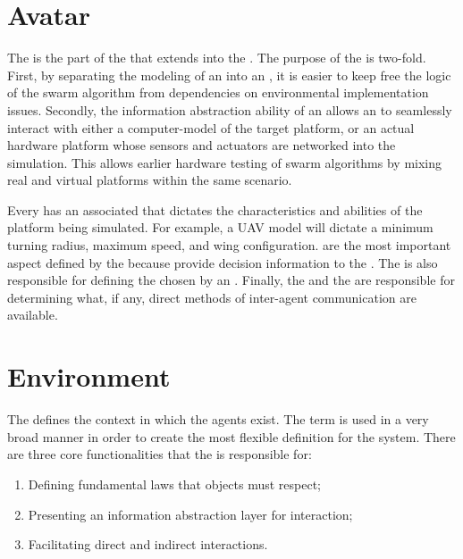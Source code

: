 \clearpage

\section{Avatar}
The  is the part of the  that extends into the . The purpose of the  is two-fold. First, by separating the modeling of an  into an , it is easier to keep free the logic of the swarm algorithm from dependencies on environmental implementation issues. Secondly, the information abstraction ability of an  allows an  to seamlessly interact with either a computer-model of the target platform, or an actual hardware platform whose sensors and actuators are networked into the simulation. This allows earlier hardware testing of swarm algorithms by mixing real and virtual platforms within the same scenario.

Every  has an associated  that dictates the characteristics and abilities of the platform being simulated. For example, a UAV model will dictate a minimum turning radius, maximum speed, and wing configuration.  are the most important aspect defined by the  because  provide decision information to the . The  is also responsible for defining the  chosen by an . Finally, the  and the  are responsible for determining what, if any, direct methods of inter-agent communication are available.

\section{Environment}

The  defines the context in which the agents exist. The term  is used in a very broad manner in order to create the most flexible definition for the system. There are three core functionalities that the  is responsible for:

\begin{enumerate}
	\item Defining fundamental laws that  objects must respect;
	\item Presenting an information abstraction layer for  interaction;
	\item Facilitating direct and indirect  interactions.
\end{enumerate}

